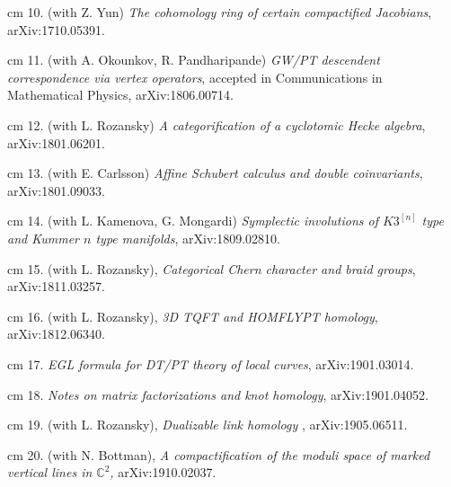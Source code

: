 \documentclass[11pt]{amsart}
\theoremstyle{plain}
\theoremstyle{definition}
\theoremstyle{remark}
\begin{document}
\noindent{} cm 10. (with  Z. Yun) {\it The cohomology ring of certain compactified Jacobians},  arXiv:1710.05391. 


\noindent{} cm 11. (with A. Okounkov, R. Pandharipande) {\it  GW/PT descendent correspondence via vertex operators},
accepted in Communications in Mathematical Physics, arXiv:1806.00714.



\noindent{} cm 12. (with L. Rozansky)
{\it A categorification of a cyclotomic Hecke algebra}, arXiv:1801.06201.

\noindent{} cm 13. (with E. Carlsson)
{\it Affine Schubert calculus and double coinvariants}, arXiv:1801.09033.

\noindent{} cm 14. (with L. Kamenova, G. Mongardi) {\it Symplectic involutions of \(K3^{[n]}\) type and Kummer \(n\)
  type manifolds}, arXiv:1809.02810.

\noindent{} cm 15. (with L. Rozansky), {\it Categorical Chern character and braid groups}, arXiv:1811.03257.

\noindent{} cm 16. (with L. Rozansky), {\it 3D TQFT and HOMFLYPT homology}, arXiv:1812.06340.

\noindent{} cm 17. {\it EGL formula for DT/PT theory of local curves}, arXiv:1901.03014.

\noindent{} cm 18. {\it Notes on matrix factorizations and knot homology}, arXiv:1901.04052.

\noindent{} cm 19. (with L. Rozansky), {\it Dualizable link homology }, arXiv:1905.06511.

\noindent{} cm 20. (with N. Bottman), {\it 
A compactification of the moduli space of marked vertical lines in $\mathbb{C}^2$, } arXiv:1910.02037.
\end{document}
